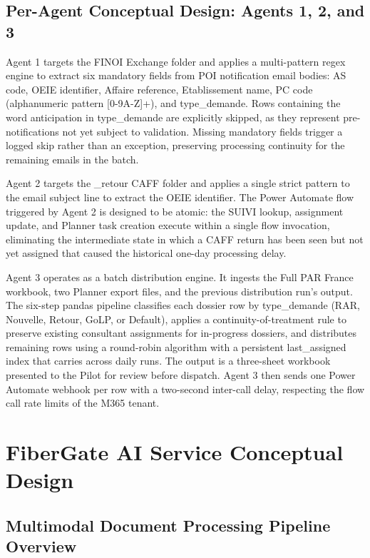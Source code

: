 \subsection{Per-Agent Conceptual Design: Agents 1, 2, and 3}

Agent 1 targets the FINOI Exchange folder and applies a multi-pattern regex engine to extract six mandatory fields from POI notification email bodies: AS code, OEIE identifier, Affaire reference, Etablissement name, PC code (alphanumeric pattern [0-9A-Z]+), and type\_demande. Rows containing the word anticipation in type\_demande are explicitly skipped, as they represent pre-notifications not yet subject to validation. Missing mandatory fields trigger a logged skip rather than an exception, preserving processing continuity for the remaining emails in the batch.

Agent 2 targets the \_retour CAFF folder and applies a single strict pattern to the email subject line to extract the OEIE identifier. The Power Automate flow triggered by Agent 2 is designed to be atomic: the SUIVI lookup, assignment update, and Planner task creation execute within a single flow invocation, eliminating the intermediate state in which a CAFF return has been seen but not yet assigned that caused the historical one-day processing delay.

Agent 3 operates as a batch distribution engine. It ingests the Full PAR France workbook, two Planner export files, and the previous distribution run's output. The six-step pandas pipeline classifies each dossier row by type\_demande (RAR, Nouvelle, Retour, GoLP, or Default), applies a continuity-of-treatment rule to preserve existing consultant assignments for in-progress dossiers, and distributes remaining rows using a round-robin algorithm with a persistent last\_assigned index that carries across daily runs. The output is a three-sheet workbook presented to the Pilot for review before dispatch. Agent 3 then sends one Power Automate webhook per row with a two-second inter-call delay, respecting the flow call rate limits of the M365 tenant.

\section{FiberGate AI Service Conceptual Design}

\subsection{Multimodal Document Processing Pipeline Overview}

